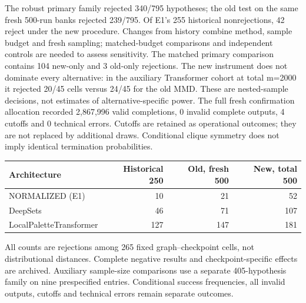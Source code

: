 The robust primary family rejected 340/795 hypotheses; the old test on the same fresh 500-run banks rejected 239/795. Of E1's 255 historical nonrejections, 42 reject under the new procedure. Changes from history combine method, sample budget and fresh sampling; matched-budget comparisons and independent controls are needed to assess sensitivity.
The matched primary comparison contains 104 new-only and 3 old-only rejections. The new instrument does not dominate every alternative: in the auxiliary Transformer cohort at total m=2000 it rejected 20/45 cells versus 24/45 for the old MMD. These are nested-sample decisions, not estimates of alternative-specific power.
The full fresh confirmation allocation recorded 2,867,996 valid completions, 0 invalid complete outputs, 4 cutoffs and 0 technical errors. Cutoffs are retained as operational outcomes; they are not replaced by additional draws. Conditional clique symmetry does not imply identical termination probabilities.
\begin{center}
\begin{tabular}{lrrr}\toprule
Architecture & Historical 250 & Old, fresh 500 & New, total 500\\\midrule
NORMALIZED (E1) & 10 & 21 & 52\\
DeepSets & 46 & 71 & 107\\
LocalPaletteTransformer & 127 & 147 & 181\\
\bottomrule\end{tabular}
\end{center}
All counts are rejections among 265 fixed graph--checkpoint cells, not
distributional distances. Complete negative results and checkpoint-specific
effects are archived. Auxiliary sample-size comparisons use a separate
405-hypothesis family on nine prespecified entries. Conditional success
frequencies, all invalid outputs, cutoffs and technical errors remain
separate outcomes.

